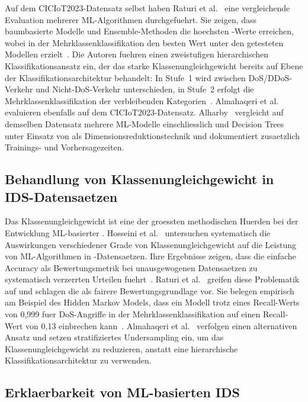Auf dem CICIoT2023-Datensatz selbst haben Raturi et al.\ \cite{raturi2026exploratory} eine
vergleichende Evaluation mehrerer ML-Algorithmen durchgefuehrt.
Sie zeigen, dass baumbasierte Modelle und Ensemble-Methoden die hoechsten \ba{}-Werte
erreichen, wobei \gb{} in der Mehrklassenklassifikation den besten Wert unter den getesteten
Modellen erzielt~\cite{raturi2026exploratory}.
Die Autoren fuehren einen zweistufigen hierarchischen Klassifikationsansatz ein, der das starke
Klassenungleichgewicht bereits auf Ebene der Klassifikationsarchitektur behandelt: In Stufe~1 wird zwischen
DoS/DDoS-Verkehr und Nicht-DoS-Verkehr unterschieden, in Stufe~2 erfolgt die
Mehrklassenklassifikation der verbleibenden Kategorien~\cite{raturi2026exploratory}.
Almahaqeri et al.\ \cite{almahaqeri2026gradient} evaluieren ebenfalls \gb{} auf dem
CICIoT2023-Datensatz.
Alharby~\cite{alharby2025ciciot} vergleicht auf demselben Datensatz mehrere ML-Modelle
einschliesslich \gb{} und Decision Trees unter Einsatz von \pca{} als
Dimensionsreduktionstechnik und dokumentiert zusaetzlich Trainings- und Vorhersagezeiten.

\subsection{Behandlung von Klassenungleichgewicht in IDS-Datensaetzen}

Das Klassenungleichgewicht ist eine der groessten methodischen Huerden bei der
Entwicklung ML-basierter \ids{}.
Hosseini et al.\ \cite{hosseini2025imbalance} untersuchen systematisch die Auswirkungen
verschiedener Grade von Klassenungleichgewicht auf die Leistung von ML-Algorithmen in
\ids{}-Datensaetzen.
Ihre Ergebnisse zeigen, dass die einfache Accuracy als Bewertungsmetrik bei unausgewogenen
Datensaetzen zu systematisch verzerrten Urteilen fuehrt~\cite{hosseini2025imbalance}.
Raturi et al.\ \cite{raturi2026exploratory} greifen diese Problematik auf und schlagen die \ba{}
als fairere Bewertungsgrundlage vor.
Sie belegen empirisch am Beispiel des Hidden Markov Models, dass ein Modell trotz eines
Recall-Werts von 0{,}999 fuer DoS-Angriffe in der Mehrklassenklassifikation auf einen
Recall-Wert von 0{,}13 einbrechen kann~\cite{raturi2026exploratory}.
Almahaqeri et al.\ \cite{almahaqeri2026gradient} verfolgen einen alternativen Ansatz und setzen
stratifiziertes Undersampling ein, um das Klassenungleichgewicht zu reduzieren, anstatt eine
hierarchische Klassifikationsarchitektur zu verwenden.

\subsection{Erklaerbarkeit von ML-basierten IDS}

